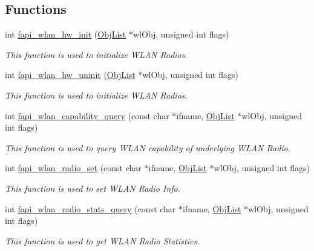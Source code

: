 \subsection*{Functions}
\begin{DoxyCompactItemize}
\item 
int \hyperlink{group__FAPI__WLAN_ga844c45d02ce51d69ee6d18131655d90e}{fapi\-\_\-wlan\-\_\-hw\-\_\-init} (\hyperlink{structObjList}{Obj\-List} $\ast$wl\-Obj, unsigned int flags)
\begin{DoxyCompactList}\small\item\em This function is used to initialize W\-L\-A\-N Radios. \end{DoxyCompactList}\item 
int \hyperlink{group__FAPI__WLAN_gaef504353477673d103692443eb1c7a3d}{fapi\-\_\-wlan\-\_\-hw\-\_\-uninit} (\hyperlink{structObjList}{Obj\-List} $\ast$wl\-Obj, unsigned int flags)
\begin{DoxyCompactList}\small\item\em This function is used to initialize W\-L\-A\-N Radios. \end{DoxyCompactList}\item 
int \hyperlink{group__FAPI__WLAN_ga32b338e3d1d0e7b4d403d2a92e572faf}{fapi\-\_\-wlan\-\_\-capability\-\_\-query} (const char $\ast$ifname, \hyperlink{structObjList}{Obj\-List} $\ast$wl\-Obj, unsigned int flags)
\begin{DoxyCompactList}\small\item\em This function is used to query W\-L\-A\-N capability of underlying W\-L\-A\-N Radio. \end{DoxyCompactList}\item 
int \hyperlink{group__FAPI__WLAN_gac853c2f835a759f4d94568dbc9878a9a}{fapi\-\_\-wlan\-\_\-radio\-\_\-set} (const char $\ast$ifname, \hyperlink{structObjList}{Obj\-List} $\ast$wl\-Obj, unsigned int flags)
\begin{DoxyCompactList}\small\item\em This function is used to set W\-L\-A\-N Radio Info. \end{DoxyCompactList}\item 
int \hyperlink{group__FAPI__WLAN_ga69276e07e4e156122a26c3f2c2a63a98}{fapi\-\_\-wlan\-\_\-radio\-\_\-stats\-\_\-query} (const char $\ast$ifname, \hyperlink{structObjList}{Obj\-List} $\ast$wl\-Obj, unsigned int flags)
\begin{DoxyCompactList}\small\item\em This function is used to get W\-L\-A\-N Radio Statistics. \end{DoxyCompactList}\item 

\end{DoxyCompactItemize}
